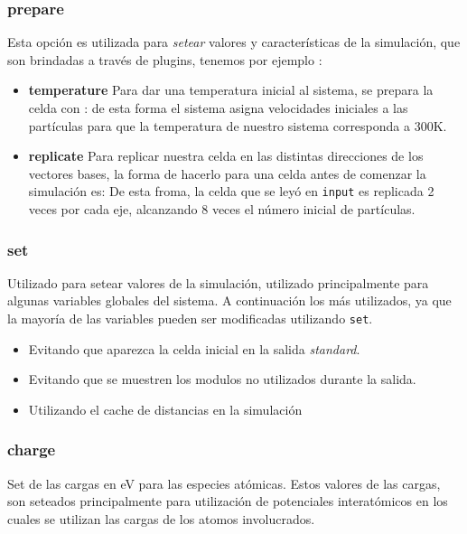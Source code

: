 \subsubsection{prepare}
Esta opci\'on es utilizada para \textit{setear} valores y caracter\'isticas de la simulaci\'on, que son brindadas a trav\'es de plugins, tenemos por ejemplo :

\begin{itemize}
 \item \textbf{temperature}
Para dar una temperatura inicial al sistema, se prepara la celda con :
de esta forma el sistema asigna velocidades iniciales a las part\'iculas para que la temperatura de nuestro sistema corresponda a 300K.
 \item \textbf{replicate}
Para replicar nuestra celda en las distintas direcciones de los vectores bases, la forma de hacerlo para una celda antes de comenzar la simulaci\'on es:
De esta froma, la celda que se ley\'o en \verb|input| es replicada 2 veces por cada eje, alcanzando 8 veces el n\'umero inicial de part\'iculas.
\end{itemize}

\subsubsection{set}
Utilizado para setear valores de la simulaci\'on, utilizado principalmente para algunas variables globales del sistema. A continuaci\'on los m\'as utilizados, ya que la mayor\'ia de las variables pueden ser modificadas utilizando \verb|set|.

\begin{itemize}
 \item Evitando que aparezca la celda inicial en la salida \textit{standard}.
 \item Evitando que se muestren los modulos no utilizados durante la salida.
 \item Utilizando el cache de distancias en la simulaci\'on
\end{itemize}

\subsubsection{charge}
Set de las cargas en eV para las especies at\'omicas. Estos valores de las cargas, son seteados principalmente para utilizaci\'on de potenciales interat\'omicos en los cuales se utilizan las cargas de los atomos involucrados.


